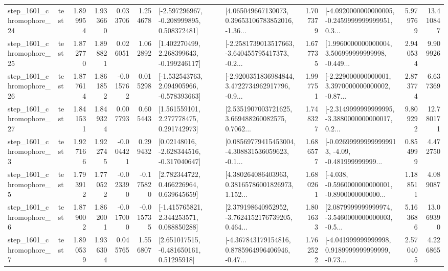 \begin{tabular}{llrrrrllrlrr}
 step\_1601\_chromophore\_24 &      test &      1.899954 &    1.933660 &      0.033706 &  1.254678 &   [-2.597296967, -0.208999895, 0.508372481] &  [4.065049667130073, 0.39653106783852016, -1.36... &       1.707379 &  [-4.0920000000000005, -0.2459999999999951, 0.3... &            5.979769 &         13.410847 \\
 step\_1601\_chromophore\_25 &      test &      1.872770 &    1.898821 &      0.026051 &  1.062892 &    [1.402270499, 2.268399643, -0.199246117] &  [-2.2581739013517663, -3.640455795417373, -0.2... &       1.677735 &  [1.9960000000000004, 3.506999999999998, -0.449... &            2.940534 &          9.909926 \\
 step\_1601\_chromophore\_26 &      test &      1.877614 &    1.861852 &     -0.015762 &  0.015298 &   [-1.532543763, 2.094905966, -0.578393663] &  [-2.9200351836984844, 3.4722734962917796, -0.9... &       1.997751 &  [-2.229000000000001, 3.3970000000000002, -0.87... &            2.873774 &          6.637369 \\
 step\_1601\_chromophore\_27 &      test &      1.841531 &    1.849324 &      0.007793 &  0.605443 &     [1.561559101, 2.277778475, 0.291742973] &  [2.5351907003721625, 3.669488260082575, 0.7062... &       1.748327 &  [-2.3149999999999995, -3.3880000000000017, 0.2... &            9.809292 &         12.780171 \\
  step\_1601\_chromophore\_3 &      test &      1.927166 &    1.922745 &     -0.004421 &  0.299432 &    [0.02148016, -2.628344516, -0.317040647] &  [0.08569779415453004, -4.308831536059623, -0.1... &       1.686577 &  [-0.026999999999999913, -4.09, -0.481999999999... &            0.854999 &          4.472750 \\
  step\_1601\_chromophore\_5 &      test &      1.793912 &    1.770522 &     -0.023390 & -0.175820 &     [2.782344722, 0.466226964, 0.639645659] &  [4.380264086403963, 0.38165786001826973, 1.152... &       1.680261 &  [-4.038, -0.5960000000000001, -0.8900000000000... &            1.188511 &          4.089087 \\
  step\_1601\_chromophore\_6 &      test &      1.879002 &    1.862001 &     -0.017000 & -0.015735 &    [-1.415765821, 2.344253571, 0.088850288] &  [2.379198640952952, -3.7624152176739205, 0.464... &       1.801633 &  [2.0879999999999974, -3.5460000000000003, -0.5... &            5.163686 &         13.069390 \\
  step\_1601\_chromophore\_7 &      test &      1.890539 &    1.936304 &      0.045765 &  1.556807 &     [2.651017515, -0.481650161, 0.51295918] &  [-4.367843179154816, 0.8785964996406946, -0.47... &       1.762522 &  [-4.041999999999998, 0.9189999999999999, -0.73... &            2.570405 &          4.226865 \\

\end{tabular}
